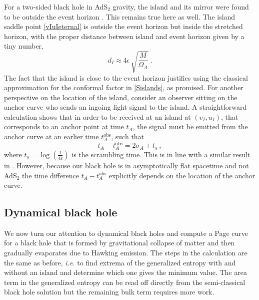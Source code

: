 \documentclass[12pt,a4paper]{article}
\newcommand{\be}{\begin{equation}}
\newcommand{\ee}{\end{equation}}
\newcommand{\f}[2]{\frac{#1}{#2}}
\begin{document}
For a two-sided black hole in AdS$_2$ gravity, the island and its mirror were found to be outside the event horizon \cite{Almheiri:2019yqk}. This remains true here as well. The island saddle point \eqref{vIuIeternal} is outside the event horizon but inside the stretched horizon, with the proper distance between island and event horizon given by a tiny number,
\be
d_I\approx 4\epsilon\,\sqrt{\f{M}{\Omega_A}}\>.
\ee
The fact that the island is close to the event horizon justifies using the classical approximation for the conformal factor in \eqref{Sislands}, as promised. 
For another perspective on the location of the island, consider an observer sitting on the anchor curve who sends an ingoing light signal to the island. A straightforward calculation shows that in order to be received at an island at $(v_I,u_I)$, that corresponds to an anchor point at time $t_A$, the signal must be emitted from the anchor curve at an earlier time $t_A^\text{obs}$, such that
\be
t_A -t_A^\text{obs}=2\sigma_A + t_s~,
\ee
where $t_s = \log{(\f1{4\epsilon})}$ is the scrambling time. This is in line with a similar result in \cite{Almheiri:2019yqk}. However, because our black hole is in asymptotically flat spacetime and not AdS$_2$ the time difference $t_A -t_A^\text{obs}$ explicitly depends on the location of the anchor curve.

%
\subsection{Dynamical black hole}\label{sec:dynamical}
%
We now turn our attention to dynamical black holes and compute a Page curve for a black hole that is formed by gravitational collapse of matter and then gradually evaporates due to Hawking emission. The steps in the calculation are the same as before, {\it i.e.} to find extrema of the generalized entropy with and without an island and determine which one gives the minimum value. The area term in the generalized entropy can be read off directly from the semi-classical black hole solution but the remaining bulk term requires more work.
\end{document}
